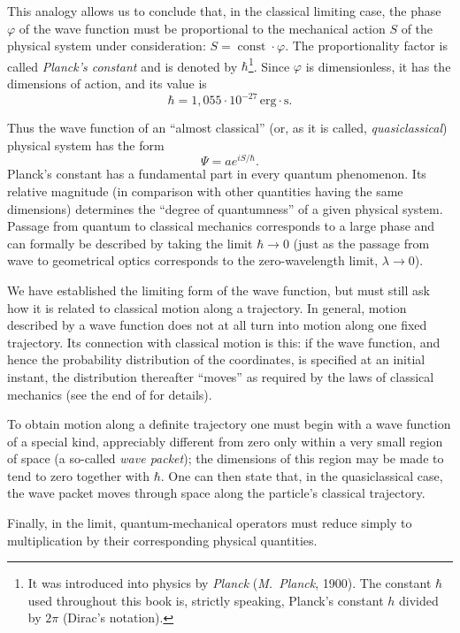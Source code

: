 This analogy allows us to conclude that, in the classical limiting case, the
phase $\varphi$ of the wave function must be proportional to the mechanical
action $S$ of the physical system under consideration: $S=\operatorname{const}
\cdot\varphi$. The proportionality factor is called \emph{Planck's constant}
and is denoted by $\hbar$\footnote{It was introduced into physics by
\emph{Planck} (\emph{M.~Planck}, 1900). The constant $\hbar$ used throughout
this book is, strictly speaking, Planck's constant $h$ divided by $2\pi$
(Dirac's notation).}. Since $\varphi$ is dimensionless, it has the dimensions
of action, and its value is
\[
  \hbar=1{,}055\cdot10^{-27}\,\text{erg}\cdot\text{s}.
\]

Thus the wave function of an ``almost classical'' (or, as it is called,
\emph{quasiclassical}) physical system has the form
\begin{equation}
  \Psi=ae^{iS/\hbar}.
  \tag{6.1}
\end{equation}
Planck's constant has a fundamental part in every quantum phenomenon. Its
relative magnitude (in comparison with other quantities having the same
dimensions) determines the ``degree of quantumness'' of a given physical
system. Passage from quantum to classical mechanics corresponds to a large
phase and can formally be described by taking the limit $\hbar\to0$ (just as
the passage from wave to geometrical optics corresponds to the zero-wavelength
limit, $\lambda\to0$).

We have established the limiting form of the wave function, but must still ask
how it is related to classical motion along a trajectory. In general, motion
described by a wave function does not at all turn into motion along one fixed
trajectory. Its connection with classical motion is this: if the wave function,
and hence the probability distribution of the coordinates, is specified at an
initial instant, the distribution thereafter ``moves'' as required by the
laws of classical mechanics (see the end of  for details).

To obtain motion along a definite trajectory one must begin with a wave
function of a special kind, appreciably different from zero only within a very
small region of space (a so-called \emph{wave packet}); the dimensions of this
region may be made to tend to zero together with $\hbar$. One can then state
that, in the quasiclassical case, the wave packet moves through space along the
particle's classical trajectory.

Finally, in the limit, quantum-mechanical operators must reduce simply to
multiplication by their corresponding physical quantities.
